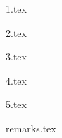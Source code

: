 \documentclass[12pt, oneside]{memoir}
\begin{document}
    
{1.tex}

{2.tex}

{3.tex}

{4.tex}

{5.tex}

{remarks.tex}
\end{document}
